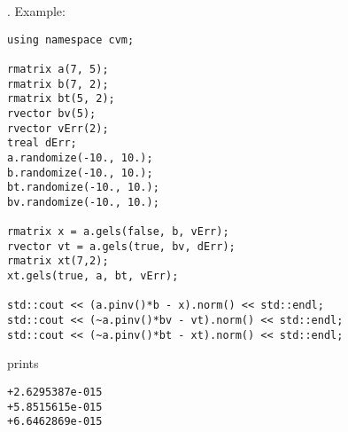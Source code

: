 .
Example:
\begin{Verbatim}
using namespace cvm;

rmatrix a(7, 5);
rmatrix b(7, 2);
rmatrix bt(5, 2);
rvector bv(5);
rvector vErr(2);
treal dErr;
a.randomize(-10., 10.);
b.randomize(-10., 10.);
bt.randomize(-10., 10.);
bv.randomize(-10., 10.);

rmatrix x = a.gels(false, b, vErr);
rvector vt = a.gels(true, bv, dErr);
rmatrix xt(7,2);
xt.gels(true, a, bt, vErr);

std::cout << (a.pinv()*b - x).norm() << std::endl;
std::cout << (~a.pinv()*bv - vt).norm() << std::endl;
std::cout << (~a.pinv()*bt - xt).norm() << std::endl;
\end{Verbatim}
prints
\begin{Verbatim}
+2.6295387e-015
+5.8515615e-015
+6.6462869e-015
\end{Verbatim}
\newpage



